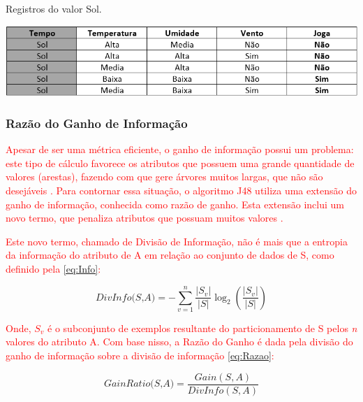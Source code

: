 \par
\begin{table}[!htp]
	\begin{center}
    \caption{\label{fig:waveform_fig} Registros do valor Sol.}
	\includegraphics[scale=0.70]{Figuras/Ramo_sol.png}
	\end{center}
\end{table}

\subsubsection{Razão do Ganho de Informação}

\par
\textcolor{red}{Apesar de ser uma métrica eficiente, o ganho de informação possui um problema: este tipo de cálculo favorece os atributos que possuem uma grande quantidade de valores (arestas), fazendo com que gere árvores muitos largas, que não são desejáveis \cite{Garcia2003}. Para contornar essa situação, o algoritmo J48 utiliza uma extensão do ganho de informação, conhecida como razão de ganho. Esta extensão inclui um novo termo, que penaliza atributos que possuam muitos valores \cite{Carvalho2014}.}

\textcolor{red}{Este novo termo, chamado de Divisão de Informação, não é mais que a entropia da informação do atributo de A em relação ao conjunto de dados de S, como definido pela \autoref{eq:Info}:}

\begin{equation}
    \label{eq:Info}
        {\textit{DivInfo(S,A)}={ - \sum_{v=1}^{n} \frac{|S_v|}{|S|} \log_{2}(\frac{|S_v|}{|S|}) } }
\end{equation}

\par
\textcolor{red}{Onde, $S_v$ é o subconjunto de exemplos resultante do particionamento de S pelos \textit{n} valores do atributo A. Com base nisso, a Razão do Ganho é dada pela divisão do ganho de informação sobre a divisão de informação \autoref{eq:Razao}:}

\begin{equation}
    \label{eq:Razao}
        {\textit{GainRatio(S,A)}={ \frac{Gain(S,A)}{DivInfo(S,A)} } }
\end{equation}


